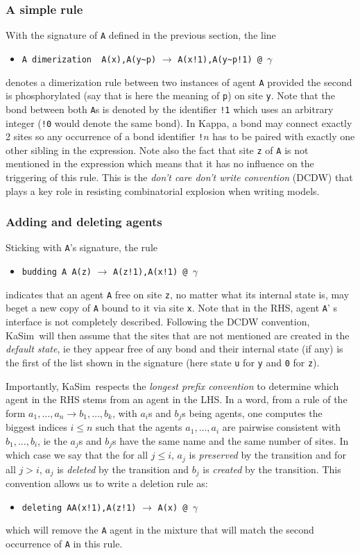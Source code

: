 \documentclass[11pt]{book}
\def\KaSim{\textsf{KaSim}}
\def\int{\hbox{\texttt{\~}}}
\def\ttt#1{\texttt{#1}}
\def\var#1{\textquotesingle #1\textquotesingle}
\def\rar{\rightarrow}
\def\ga{\gamma}
\def\ie{ie }
\def\via{via }
\def\ITE#1{\begin{itemize}#1\end{itemize}}
\begin{document}
\subsubsection*{A simple rule}
With the signature of \ttt{A} defined in the previous section, the line
\ITE{
\item[] \ttt{\textquotesingle A dimerization\textquotesingle~  A(x),A(y\int p)} $\rar$ \ttt{A(x!1),A(y\int p!1) @ $\ga$} 
}
denotes a dimerization rule between two instances of agent \ttt{A} provided the second is phosphorylated (say that is here the meaning of \ttt{p}) on site \ttt{y}. Note that the bond between both \ttt{A}s is denoted by the identifier \ttt{!1} which uses an arbitrary integer (\ttt{!0} would denote the same bond). In Kappa, a bond may connect exactly 2 sites so any occurrence of a bond identifier \ttt{!}$n$ has to be paired with exactly one other sibling in the expression. Note also the fact that site \ttt{z} of \ttt{A} is not mentioned in the expression which means that it has no influence on the triggering of this rule. This is the \emph{don't care don't write convention} (DCDW)  that plays a key role in resisting combinatorial explosion when writing models.

\subsubsection*{Adding and deleting agents}
Sticking with \ttt{A}'s signature, the rule
\ITE{
\item[] \ttt{\var{budding A}~A(z)} $\rar$ \ttt{A(z!1),A(x!1) @ $\ga$ } 
}
indicates that an agent \ttt{A} free on site \ttt{z}, no matter what its internal state is, may beget a new copy of \ttt{A} bound to it \via site \ttt{x}. Note that in the RHS, agent \ttt{A}' s interface is not completely described. Following the DCDW convention, \KaSim~will then assume that the sites that are not mentioned are created in the \emph{default state}, \ie they appear free of any bond and their internal state (if any) is the first of the list shown in the signature (here state \ttt{u} for \ttt{y} and \ttt{0} for \ttt{z}).

Importantly, \KaSim~respects the \emph{longest prefix convention} to determine which agent in the RHS stems from an agent in the LHS. 
In a word, from a rule of the form $a_1,\dots,a_n\rar b_1,\dots,b_k$, with $a_i$s and $b_j$s being agents, one computes the biggest indices $i\leq n$ such that the agents $a_1,\dots,a_i$ are pairwise consistent with $b_1,\dots,b_i$, \ie the $a_j$s and $b_j$s have the same name and the same number of sites. In which case we say that the for all $j\leq i$, $a_j$ is \emph{preserved} by the transition and for all $j>i$, $a_j$ is \emph{deleted} by the transition and $b_j$ is \emph{created} by the transition. This convention allows us to write a deletion rule as:
\ITE{
\item[] \ttt{\textquotesingle deleting A\textquotesingle  A(x!1),A(z!1)} $\rar$ \ttt{A(x) @ $\ga$} 
}
which will remove the \ttt{A} agent in the mixture that will match the second occurrence of \ttt{A} in this rule.
\end{document}
